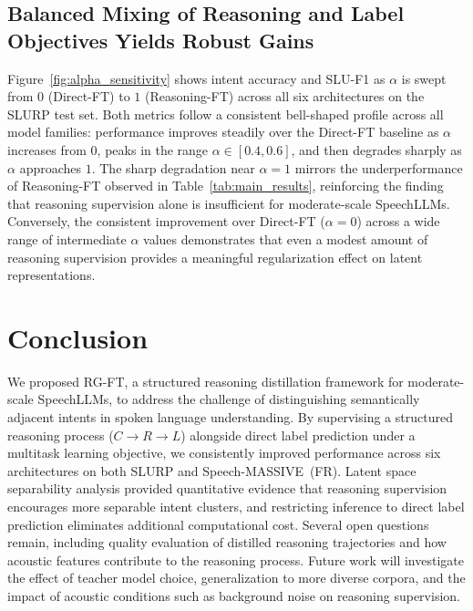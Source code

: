\documentclass[cameraready]{Interspeech}
\begin{document}
\subsection{Balanced Mixing of Reasoning and Label Objectives Yields Robust Gains}
\label{sec:alpha_analysis}
Figure~\ref{fig:alpha_sensitivity} shows intent accuracy and SLU-F1
as $\alpha$ is swept from $0$ (Direct-FT) to $1$ (Reasoning-FT) across
all six architectures on the SLURP test set.
Both metrics follow a consistent bell-shaped profile across all model
families: performance improves steadily over the Direct-FT baseline
as $\alpha$ increases from $0$, peaks in the range
$\alpha \in [0.4, 0.6]$, and then degrades sharply as $\alpha$
approaches $1$.
The sharp degradation near $\alpha{=}1$ mirrors the underperformance
of Reasoning-FT observed in Table~\ref{tab:main_results}, reinforcing
the finding that reasoning supervision alone is insufficient for
moderate-scale SpeechLLMs.
Conversely, the consistent improvement over Direct-FT ($\alpha{=}0$)
across a wide range of intermediate $\alpha$ values demonstrates that
even a modest amount of reasoning supervision provides a meaningful
regularization effect on latent representations.

\section{Conclusion}
\label{sec:conclusion}
We proposed RG-FT, a structured reasoning distillation framework
for moderate-scale SpeechLLMs, to address the challenge of
distinguishing semantically adjacent intents in spoken language
understanding. By supervising a structured reasoning process
($C \to R \to L$) alongside direct label prediction under a
multitask learning objective, we consistently improved performance
across six architectures on both SLURP and Speech-MASSIVE~(FR).
Latent space separability analysis provided quantitative evidence
that reasoning supervision encourages more separable intent clusters,
and restricting inference to direct label prediction eliminates
additional computational cost.
Several open questions remain, including quality evaluation of
distilled reasoning trajectories and how acoustic features contribute
to the reasoning process.
Future work will investigate the effect of teacher model choice,
generalization to more diverse corpora, and the impact of acoustic
conditions such as background noise on reasoning supervision.


\end{document}
